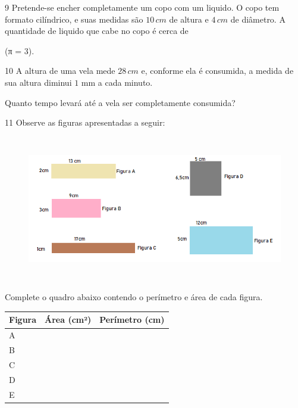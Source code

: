 \num{9}  Pretende-se encher completamente um copo com um liquido. O copo tem
formato cilíndrico, e suas medidas são $10\,cm$ de altura e $4\,cm$ de
diâmetro. A quantidade de liquido que cabe no copo é cerca de

(π = $3$).


\num{10}  A altura de uma vela mede $28\,cm$ e, conforme ela é consumida, a
medida de sua altura diminui $1$ mm a cada minuto.

Quanto tempo levará até a vela ser completamente consumida?


\num{11}  Observe as figuras apresentadas a seguir:

\begin{figure}[h]
\centering\includegraphics[width=5.90625in,height=2.51042in]{./imgSAEB_6_MAT/media/image98.png}
\end{figure}

Complete o quadro abaixo contendo o perímetro e área de cada figura.


\begin{table}[h]\centering
\begin{tabular}[]{l|l|l}
\toprule
Figura & Área (cm²) & Perímetro (cm)\\
\midrule
A & ~ & ~\\
B & ~ & ~\\
C & ~ & ~\\
D & ~ & ~\\
E & ~ & ~\\
\bottomrule
\end{tabular}
\end{table}


